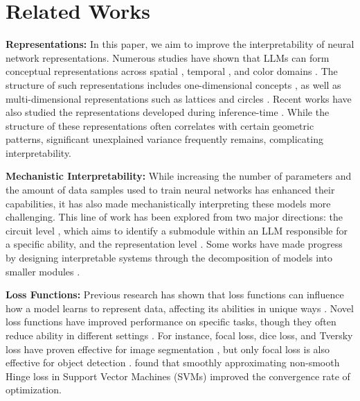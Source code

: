 \section{Related Works}
\label{sec:related-works}

{\bf Representations:} In this paper, we aim to improve the interpretability of neural network representations. Numerous studies have shown that LLMs can form conceptual representations across spatial \citep{gurnee2023language}, temporal \citep{li2021implicit}, and color domains \citep{abdou2021can}. The structure of such representations includes one-dimensional concepts \citep{gurnee2023language, marks2023geometry, heinzerling2024monotonic, park2024geometry}, as well as multi-dimensional representations such as lattices \citep{michaud2024opening,li2024geometry} and circles \citep{liu2022towards, engels2024not}. Recent works have also studied the representations developed during inference-time \cite{park2024iclr}. While the structure of these representations often correlates with certain geometric patterns, significant unexplained variance frequently remains, complicating interpretability.

{\bf Mechanistic Interpretability:}  While increasing the number of parameters and the amount of data samples used to train neural networks has enhanced their capabilities, it has also made mechanistically interpreting these models more challenging. This line of work has been explored from two major directions: the circuit level \citep{michaud2024opening, olah2020circuits, olsson2022context, templeton2024claude}, which aims to identify a submodule within an LLM responsible for a specific ability, and the representation level \citep{liu2022omnigrok, ding2024survival, zhong2024clock}. 
Some works have made progress by designing interpretable systems through the decomposition of models into smaller modules \citep{olah2020circuits, liu2023seeing}.

{\bf Loss Functions:}  Previous research has shown that loss functions can influence how a model learns to represent data, affecting its abilities in unique ways \citep{li2024enhancing, bosco2024cardio}. Novel loss functions have improved performance on specific tasks, though they often reduce ability in different settings \citep{bom2023wind, seber2024protein}. For instance, focal loss, dice loss, and Tversky loss have proven effective for image segmentation \citep{sudre2017dice, demir2023topo, sal2017tversky}, but only focal loss is also effective for object detection \citep{lin2017focal}. \citet{luo2021learning} found that smoothly approximating non-smooth Hinge loss in Support Vector Machines (SVMs) improved the convergence rate of optimization.



